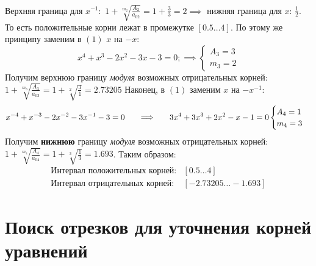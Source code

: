 Верхняя граница для $x^{-1}:$ $1+\sqrt[m_2]{\frac{A_2}{a_{02}}} = 1 +\frac{3}{3} = 2\implies$ нижняя граница для $x$: $\frac{1}{2}$. То есть положительные корни лежат в промежутке $[0.5\ldots4]$.
По этому же принципу заменим в $(1)$ $x$ на $-x$:
\begin{equation}
    x^4+x^3-2x^2-3x-3=0; \implies
     \begin{cases}
        A_3 = 3 \\
        m_3 = 2
    \end{cases}
\end{equation}
Получим верхнюю границу {\it модуля} возможных отрицательных корней: $1+\sqrt[m_3]{\frac{A_3}{a_{03}}} = 1 +\sqrt[2]{\frac{3}{1}} = 2.73205$
Наконец, в $(1)$ заменим $x$ на $-x^{-1}$:
\begin{equation}
    x^{-4}+x^{-3}-2x^{-2}-3x^{-1}-3=0 \hspace{0.5cm} \implies \hspace{0.5cm}
    3x^4+3x^3+2x^2-x-1=0
    \begin{cases}
        A_4 = 1 \\
        m_4 = 3
    \end{cases}
\end{equation}
Получим {\bf нижнюю} границу {\it модуля} возможных отрицательных корней: $1+\sqrt[m_4]{\frac{A_4}{a_{04}}} = 1 +\sqrt[3]{\frac{1}{3}} = 1.693$. Таким образом:
\begin{equation}
    \begin{matrix}
        \text{Интервал положительных корней:} & [0.5 \ldots 4] \\
        \text{Интервал отрицательных корней:} & [-2.73205 \ldots -1.693]
    \end{matrix}
\end{equation}

\section{Поиск отрезков для уточнения корней уравнений}
